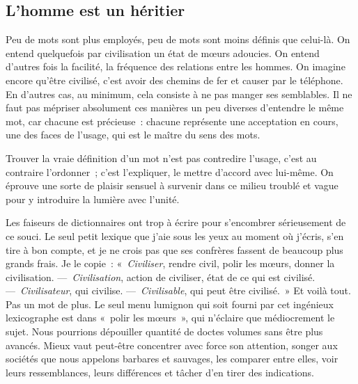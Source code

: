 \documentclass[french,twoside]{book} %
\newcommand{\astermono}{\medskip\centerline{\color{rubric}\large\selectfont{\syms ✻}}\medskip\par}%
\begin{document}
\subsection[{L’homme est un héritier}]{L’homme est un héritier}
\noindent Peu de mots sont plus employés, peu de mots sont moins définis que celui-là. On entend quelquefois par civilisation un état de mœurs adoucies. On entend d’autres fois la facilité, la fréquence des relations entre les hommes. On imagine encore qu’être civilisé, c’est avoir des chemins de fer et causer par le téléphone. En d’autres cas, au minimum, cela consiste à ne pas manger ses semblables. Il ne faut pas mépriser absolument ces manières un peu diverses d’entendre le même mot, car chacune est précieuse : chacune représente une acceptation en cours, une des faces de l’usage, qui est le maître du sens des mots.\par
Trouver la vraie définition d’un mot n’est pas contredire l’usage, c’est au contraire l’ordonner ; c’est l’expliquer, le mettre d’accord avec lui-même. On éprouve une sorte de plaisir sensuel à survenir dans ce milieu troublé et vague pour y introduire la lumière avec l’unité.\par
Les faiseurs de dictionnaires ont trop à écrire pour s’encombrer sérieusement de ce souci. Le seul petit lexique que j’aie sous les yeux au moment où j’écris, s’en tire à bon compte, et je ne crois pas que ses confrères fassent de beaucoup plus grands frais. Je le copie : «\emph{ Civiliser}, rendre civil, polir les mœurs, donner la civilisation. — \emph{Civilisation}, action de civiliser, état de ce qui est civilisé. — \emph{Civilisateur}, qui civilise. — \emph{Civilisable}, qui peut être civilisé. » Et voilà tout. Pas un mot de plus. Le seul menu lumignon qui soit fourni par cet ingénieux lexicographe est dans « polir les mœurs », qui n’éclaire que médiocrement le sujet. Nous pourrions dépouiller quantité de doctes volumes sans être plus avancés. Mieux vaut peut-être concentrer avec force son attention, songer aux sociétés que nous appelons barbares et sauvages, les comparer entre elles, voir leurs ressemblances, leurs différences et tâcher d’en tirer des indications.\par

\astermono
\end{document}
